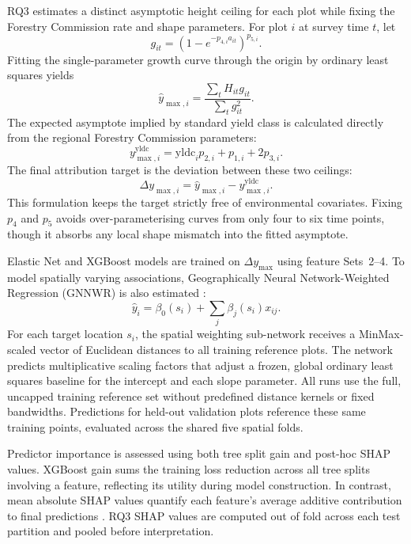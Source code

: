 \documentclass[logo,msc,ai]{infthesis}           %
\begin{document}
RQ3 estimates a distinct asymptotic height ceiling for each plot while fixing the Forestry Commission rate and shape parameters. For plot $i$ at survey time $t$, let
\begin{equation}
g_{it}=\left(1-e^{-p_{4,i}a_{it}}\right)^{p_{5,i}}.
\end{equation}
Fitting the single-parameter growth curve through the origin by ordinary least squares yields
\begin{equation}
\hat y_{\max,i}=\frac{\sum_t H_{it}g_{it}}{\sum_t g_{it}^2}.
\label{eq:plot-ymax-fit}
\end{equation}
The expected asymptote implied by standard yield class is calculated directly from the regional Forestry Commission parameters:
\begin{equation}
y_{\max,i}^{\mathrm{yldc}}=\mathrm{yldc}_i p_{2,i}+p_{1,i}+2p_{3,i}.
\end{equation}
The final attribution target is the deviation between these two ceilings:
\begin{equation}
\Delta y_{\max,i}=\hat y_{\max,i}-y_{\max,i}^{\mathrm{yldc}}.
\label{eq:local-ymax-diff}
\end{equation}
This formulation keeps the target strictly free of environmental covariates. Fixing $p_4$ and $p_5$ avoids over-parameterising curves from only four to six time points, though it absorbs any local shape mismatch into the fitted asymptote.

Elastic Net and XGBoost models are trained on $\Delta y_{\max}$ using feature Sets~2--4. To model spatially varying associations, Geographically Neural Network-Weighted Regression (GNNWR) is also estimated \cite{du2020Geographically_C6_GWR}:
\begin{equation}
\hat y_i=\beta_0(s_i)+\sum_j\beta_j(s_i)x_{ij}.
\label{eq:gnnwr}
\end{equation}
For each target location $s_i$, the spatial weighting sub-network receives a MinMax-scaled vector of Euclidean distances to all training reference plots. The network predicts multiplicative scaling factors that adjust a frozen, global ordinary least squares baseline for the intercept and each slope parameter. All runs use the full, uncapped training reference set without predefined distance kernels or fixed bandwidths. Predictions for held-out validation plots reference these same training points, evaluated across the shared five spatial folds.

Predictor importance is assessed using both tree split gain and post-hoc SHAP values. XGBoost gain sums the training loss reduction across all tree splits involving a feature, reflecting its utility during model construction. In contrast, mean absolute SHAP values quantify each feature's average additive contribution to final predictions \cite{lundberg2017unified}. RQ3 SHAP values are computed out of fold across each test partition and pooled before interpretation.
\end{document}
